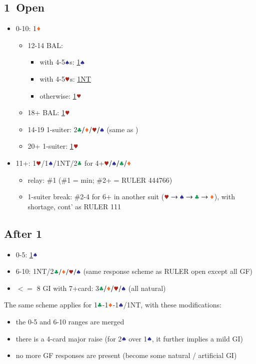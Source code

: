 \documentclass{article}
\begin{document}
\begin{multicols}{2}
\section{1\CCC\ Open}\label{sec:1c}
\begin{itemize}
    \item 0-10: 1$\ddd$
    \begin{itemize}
        \item 12-14 BAL:
        \begin{itemize}
            \item with 4-5$\sss$s: \hyperref[sec:1c1d1h]{1$\sss$}
            \item with 4-5$\hhh$s: \hyperref[sec:1c1d1h]{1NT}
            \item otherwise: \hyperref[sec:1c1d1h]{1$\hhh$}
        \end{itemize}
        \item 18+ BAL: \hyperref[sec:1c1d1h]{1$\hhh$}
        \item 14-19 1-suiter: 2$\ccc/\ddd/\hhh/\sss$ (same as )
        \item 20+ 1-suiter: \hyperref[sec:1c1d1h]{1$\hhh$}
    \end{itemize}
    \item 11+: 1$\hhh$/1$\sss$/1NT/2$\ccc$ 
    for 4+$\hhh/\sss/\ccc/\ddd$
    \begin{itemize}
        \item relay: \#1 (\#1 = min; \#2+ = RULER 444766)
        \item 1-suiter break: \#2-4 for 6+ in another suit ($\hscd$), with shortage, cont' as RULER 111
    \end{itemize}
\end{itemize}

\subsection{After 1\HHH}\label{sec:1c1d1h}
\begin{itemize}
    \item 0-5: \hyperref[sec:1c1d1h1s]{1$\sss$}
    \item 6-10: 1NT/2$\ccc/\ddd/\hhh/\sss$
        (same response scheme as RULER open except all GF)
    \item $<=$ 8 GI with 7+card: 3$\ccc/\ddd/\hhh/\sss$ (all natural)
\end{itemize}

\noindent The same scheme applies for 1$\ccc$-1$\ddd$-1$\sss$/1NT, with these modifications:
\begin{itemize}
    \item the 0-5 and 6-10 ranges are merged
    \item there is a 4-card major raise (for 2$\sss$ over 1$\sss$, it further implies a mild GI)
    \item no more GF responses are present (become some natural / artificial GI)
\end{itemize}


\end{multicols}
\end{document}

